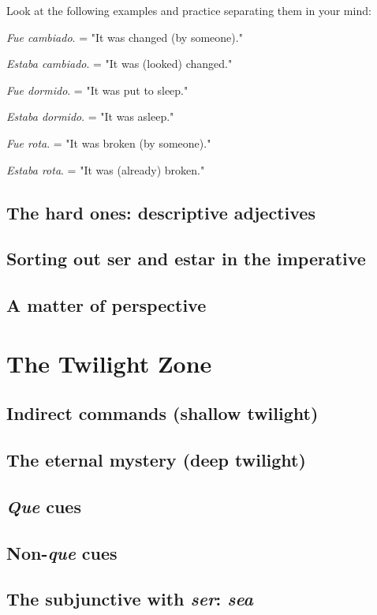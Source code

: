 \documentclass[14pt,a4paper,oneside]{memoir}
\newcommand{\bsk}{\vspace{20pt}}
\newcommand{\indu}{\hspace{20pt}}
\begin{document}
Look at the following examples and practice separating them
in your mind:

\bsk

\indu \emph{Fue cambiado}. = "It was changed (by someone)."

\indu \emph{Estaba cambiado}. = "It was (looked) changed." 

\indu \emph{Fue dormido}. = "It was put to sleep."

\indu \emph{Estaba dormido}. = "It was asleep."

\indu \emph{Fue rota}. = "It was broken (by someone)."

\indu \emph{Estaba rota}. = "It was (already) broken."

\section{The hard ones: descriptive adjectives}
\section{Sorting out ser and estar in the imperative}
\section{A matter of perspective}

\chapter{The Twilight Zone}

\section{Indirect commands (shallow twilight)}
\section{The eternal mystery (deep twilight)}
\section{\emph{Que} cues}
\section{Non-\emph{que} cues}
\section{The subjunctive with \emph{ser}: \emph{sea}}
\end{document}
